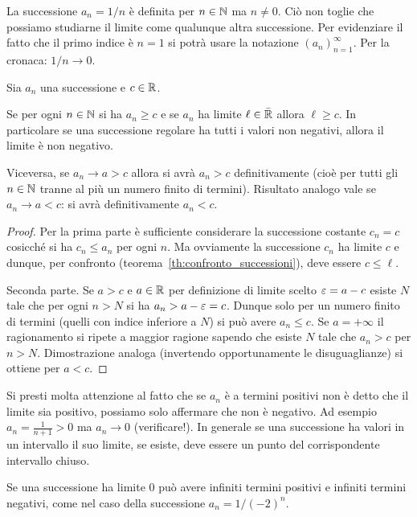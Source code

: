 \begin{example}
La successione $a_n = 1/n$ è definita per $n\in \mathbb N$ ma $n\neq 0$.
Ciò non toglie che possiamo studiarne il limite come qualunque altra
successione. Per evidenziare il fatto che il primo indice è $n=1$
si potrà usare la notazione $(a_n)_{n=1}^\infty$.
Per la cronaca: $1/n \to 0$.
\end{example}


\begin{corollary}
\mymark{***}%
%
%
%
Sia $a_n$ una successione e $c\in \mathbb R$.

Se per ogni $n\in \mathbb N$ si ha $a_n \ge c$ e se $a_n$ ha limite $\ell \in \bar {\mathbb R}$
allora $\ell \ge c$.
In particolare se una successione regolare ha tutti i valori non negativi,
allora il limite è non negativo.

Viceversa, se
$a_n \to a > c$ allora si avrà $a_n>c$ definitivamente
(cioè per tutti gli $n\in \mathbb N$ tranne al più un numero finito
di termini).
Risultato analogo vale se $a_n \to a < c$: si avrà
definitivamente $a_n < c$.
\end{corollary}
%
\begin{proof}
\mymark{**}
Per la prima parte
è sufficiente considerare la successione costante $c_n = c$
cosicché si ha $c_n \le a_n$ per ogni $n$. Ma ovviamente
la successione $c_n$ ha limite $c$ e dunque,
per confronto (teorema~\ref{th:confronto_successioni}),
deve essere $c\le \ell$.

Seconda parte. Se $a>c$ e $a\in \mathbb R$
per definizione di limite scelto $\varepsilon = a-c$ esiste $N$
tale che per ogni $n>N$ si ha $a_n > a-\varepsilon = c$.
Dunque solo per un numero finito di termini
(quelli con indice inferiore a $N$)
si può avere $a_n \le c$.
Se $a=+\infty$ il ragionamento
si ripete a maggior ragione sapendo che esiste $N$
tale che $a_n>c$ per $n>N$.
Dimostrazione analoga (invertendo opportunamente le disuguaglianze)
si ottiene per $a<c$.
\end{proof}

Si presti molta attenzione al fatto che se $a_n$ è a termini positivi
non è detto che il limite sia positivo, possiamo solo affermare
che non è negativo. Ad esempio $a_n = \frac{1}{n+1}>0$
ma $a_n \to 0$ (verificare!).
In generale se una successione ha valori in un intervallo il suo limite,
se esiste, deve essere un punto del corrispondente intervallo chiuso.

Se una successione ha limite $0$ può avere infiniti termini
positivi e infiniti termini negativi, come nel caso
della successione $a_n = 1/(-2)^n$.

